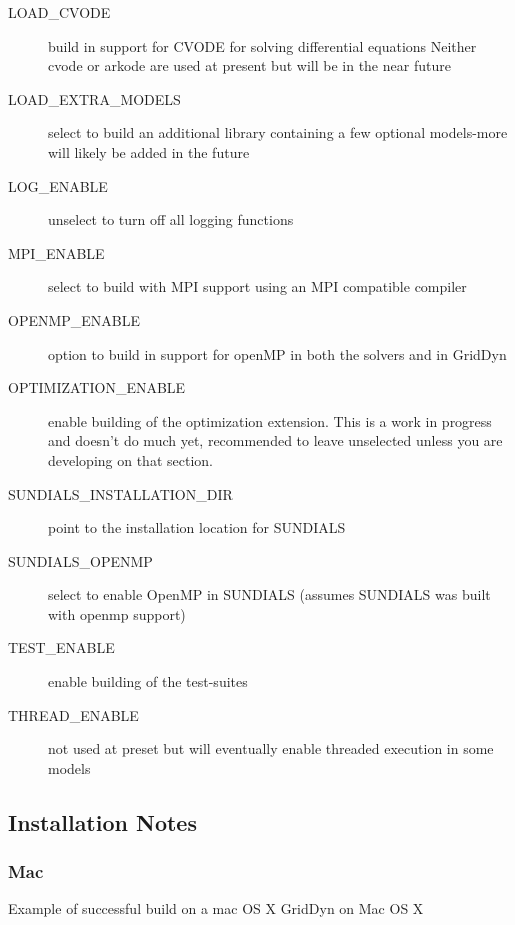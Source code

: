 \documentclass[12pt]{article} %
\begin{document}
\begin{description}
\item [LOAD\_CVODE] build in support for CVODE for solving differential equations Neither cvode or arkode are used at present but will be in the near future
\item [LOAD\_EXTRA\_MODELS] select to build an additional library containing a few optional models-more will likely be added in the future
\item [LOG\_ENABLE]  unselect to turn off all logging functions
\item [MPI\_ENABLE] select to build with MPI support using an MPI compatible compiler
\item [OPENMP\_ENABLE] option to build in support for openMP in both the solvers and in GridDyn
\item [OPTIMIZATION\_ENABLE]  enable building of the optimization extension.  This is a work in progress and doesn't do much yet,  recommended to leave unselected unless you are developing on that section.
\item [SUNDIALS\_INSTALLATION\_DIR] point to the installation location for SUNDIALS
\item [SUNDIALS\_OPENMP]  select to enable OpenMP in SUNDIALS (assumes SUNDIALS was built with openmp support)
\item [TEST\_ENABLE]  enable building of the test-suites
\item [THREAD\_ENABLE]   not used at preset but will eventually enable threaded execution in some models
\end{description}

\subsection{Installation Notes}
\subsubsection{Mac}
Example of successful build on a mac OS X
GridDyn on Mac OS X
\end{document}
